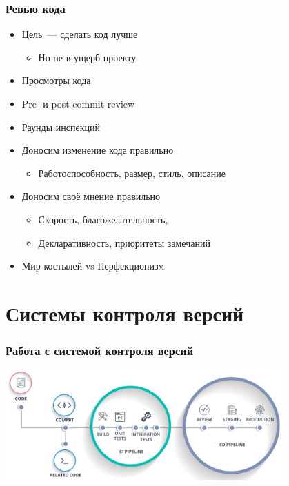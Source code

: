 \documentclass{../../slides-style}
\begin{document}
    \begin{frame}
        \frametitle{Ревью кода}
        \begin{itemize}
            \item Цель~--- сделать код лучше
            \begin{itemize}
                \item Но не в ущерб проекту
            \end{itemize}
            \item Просмотры кода
            \item Pre- и post-commit review
            \item Раунды инспекций
            \item Доносим изменение кода правильно
            \begin{itemize}
                \item Работоспособность, размер, стиль, описание
            \end{itemize}
            \item Доносим своё мнение правильно
            \begin{itemize}
                \item Скорость, благожелательность, 
                \item Декларативность, приоритеты замечаний
            \end{itemize}
            \item Мир костылей vs Перфекционизм
        \end{itemize}
    \end{frame}

    \section{Системы контроля версий}

    \begin{frame}
        \frametitle{Работа с системой контроля версий}
        \begin{center}
            \includegraphics[width=0.8\textwidth]{vcsPipeline.png}
        \end{center}
    \end{frame}
\end{document}
